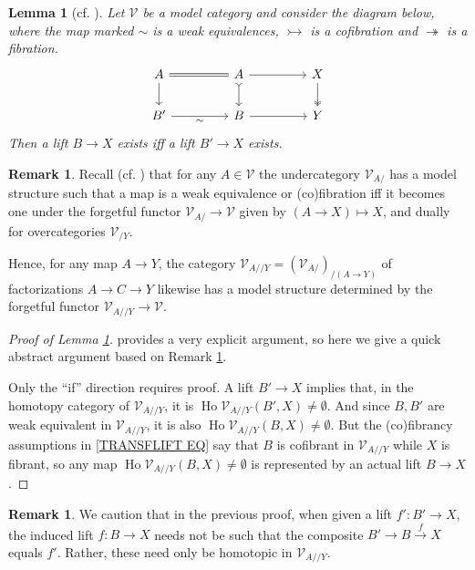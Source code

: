 \documentclass[a4paper,10pt
,draft
]{article}%
\numberwithin{equation}{section}
\numberwithin{figure}{section}
\newtheorem{lemma}[equation]{Lemma}%
\theoremstyle{definition} %
\newtheorem{remark}[equation]{Remark}%
\DeclareMathOperator{\Ho}{Ho}
\newcommand{\V}{\ensuremath{\mathcal V}}
\newcommand{\1}{\ensuremath{\mathbbm 1}}%
\begin{document}
\begin{lemma}[{cf. \cite[Lemma 2.6]{Ber07b}}]
	\label{TRANSFLIFT LEMMA}
	Let $\V$ be a model category and consider the diagram below, 
	where the map marked $\sim$ is a weak equivalences, 
	$\rightarrowtail$ is a cofibration
	and $\twoheadrightarrow$ is a fibration.
\begin{equation}\label{TRANSFLIFT EQ}
\begin{tikzcd}[column sep = 45pt]
	A
	\ar{d}
	\arrow[equal]{r}
&
	A \ar{r}
	\arrow[rightarrowtail]{d}
&
	X \arrow[twoheadrightarrow]{d}
\\
	B'
	\arrow{r}[swap]{\sim}
&
	B\ar{r}
&
	Y
\end{tikzcd}
\end{equation}
Then a lift $B \to X$ %
exists iff
a lift $B' \to X$ %
exists.
\end{lemma}


\begin{remark}\label{UNDEROVER REM}
	Recall (cf. \cite[Rem. 3.10]{DS95})
	that for any $A \in \V$ the undercategory $\V_{A/}$
	has a model structure such that a map is a 
	weak equivalence or (co)fibration iff it becomes one under the 
	forgetful functor
	$\V_{A/} \to \V$ given by $(A \to X) \mapsto X$,
	and dually for overcategories $\V_{/Y}$.
	
	Hence, for any map $A \to Y$,
	the category 
	$\V_{A//Y} = \left(\V_{A/}\right)_{/(A\to Y)}$
	of factorizations $A \to C \to Y$
	likewise has a model structure determined by the forgetful functor
	$\V_{A//Y} \to \V$.
\end{remark}


\begin{proof}[Proof of Lemma \ref{TRANSFLIFT LEMMA}]
	\cite{Ber07b} provides a very explicit argument, so here we give a quick abstract argument based on Remark \ref{UNDEROVER REM}.
	
	Only the ``if'' direction requires proof.
	A lift $B' \to X$ implies that,
	in the homotopy category of $\V_{A//Y}$, it is
	$\Ho \V_{A//Y}(B',X) \neq \emptyset$. 
	And since $B,B'$ are weak equivalent in 
	$\V_{A//Y}$, it is also 
	$\Ho \V_{A//Y}(B,X) \neq \emptyset$.
	But the (co)fibrancy assumptions in \eqref{TRANSFLIFT EQ}
	say that $B$ is cofibrant in $\V_{A//Y}$ while 
	$X$ is fibrant, so any map $\Ho \V_{A//Y}(B,X) \neq \emptyset$
	is represented by an actual lift $B \to X$.
\end{proof}


\begin{remark}\label{NOTMATCH REM}
	We caution that in the previous proof, when given a lift $f'\colon B' \to X$,
	the induced lift $f \colon B \to X$
	needs not be such that the composite $B' \to B \xrightarrow{f} X$
	equals $f'$. Rather, these need only be homotopic in 
	$\V_{A//Y}$.
\end{remark}
\end{document}

